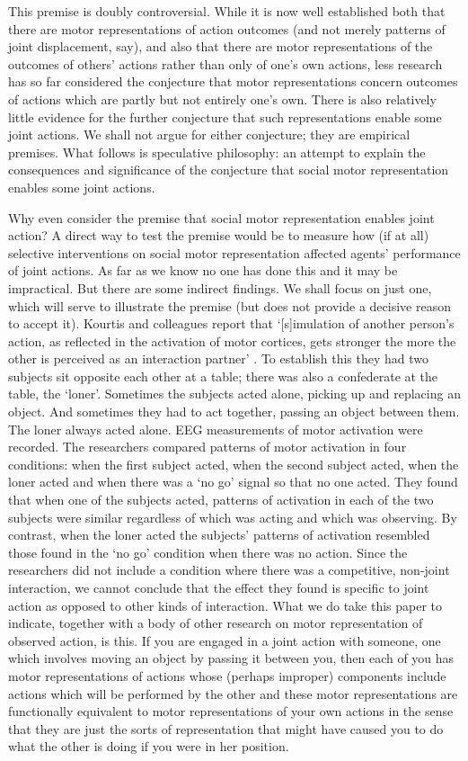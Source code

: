 \documentclass[12pt,\papersize]{extarticle}
\begin{document}
This premise is doubly controversial.
While it is now well established both that there are motor representations of action outcomes (and not merely patterns of joint displacement, say), and also that there are motor representations of the outcomes of others' actions rather than only of one's own actions,
less research has so far considered the conjecture that motor representations concern outcomes of actions which are partly but not entirely one's own.
There is also relatively little evidence for the further conjecture that such representations enable some joint actions.
We shall not argue for either conjecture; they are empirical premises.  
What follows is speculative philosophy: an attempt to explain the consequences and significance of the conjecture that social motor representation enables some joint actions.

Why even consider the premise that social motor representation enables joint action?
A direct way to test the premise would be to 
measure how (if at all) selective interventions on social motor representation affected agents’ performance of joint actions.
As far as we know no one has done this and it may be impractical.
But there are some indirect findings.
We shall focus on just one, which will serve to illustrate the premise (but does not provide a decisive reason to accept it).
Kourtis and colleagues report that `[s]imulation of another person’s action, as reflected in the activation of motor cortices, gets stronger the more the other is perceived as an interaction partner’  \citep[p.\ 4]{kourtis:2010_favoritism}.
To establish this they had two subjects sit opposite each other at a table; there was also a confederate at the table, the `loner'.  
Sometimes the subjects acted alone, picking up and replacing an object.  And sometimes they had to act together, passing an object between them.  
The loner always acted alone.
EEG measurements of motor activation were recorded.
The researchers compared patterns of motor activation in four conditions: when the first subject acted, when the second subject acted, when the loner acted and when there was a `no go' signal so that no one acted.
They found that when one of the subjects acted, patterns of activation in each of the two subjects were similar regardless of which was acting and which was observing.
By contrast, when the loner acted the subjects' patterns of activation resembled those found in the `no go' condition when there was no action.
Since the researchers did not include a condition where there was a competitive, non-joint interaction, we cannot conclude that the effect they found is specific to joint action as opposed to other kinds of interaction.
What we do take this paper to indicate, 
together with a body of other research on motor representation of observed action,
is this.
If you are engaged in a joint action with someone, one which involves moving an object by passing it between you, then each of you has motor representations of actions whose (perhaps improper) components include actions which will be performed by the other  and these motor representations are functionally equivalent to motor representations of your own actions in the sense that they are just the sorts of representation that might have caused you to do what the other is doing if you were in her position.
\end{document}

